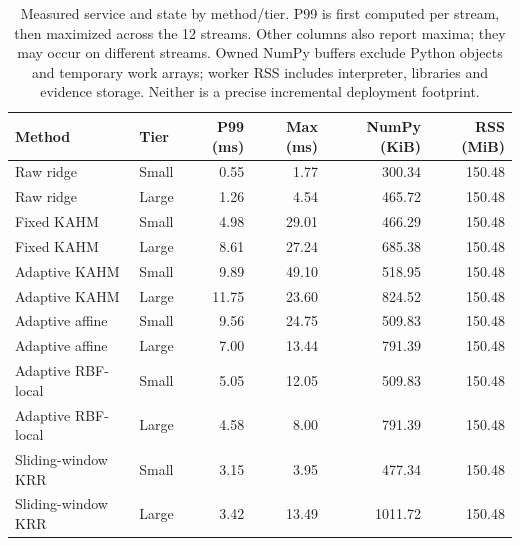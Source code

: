 \begin{table}[!htbp]
\centering\small\setlength{\tabcolsep}{5pt}
\caption{Measured service and state by method/tier. P99 is first computed per stream, then maximized across the 12 streams. Other columns also report maxima; they may occur on different streams. Owned NumPy buffers exclude Python objects and temporary work arrays; worker RSS includes interpreter, libraries and evidence storage. Neither is a precise incremental deployment footprint.}
\label{tab:adaptive-development-resources}
\begin{tabular}{@{}llrrrr@{}}
\toprule
Method & Tier & P99 (ms) & Max (ms) & NumPy (KiB) & RSS (MiB) \\
\midrule
Raw ridge & Small & 0.55 & 1.77 & 300.34 & 150.48 \\
Raw ridge & Large & 1.26 & 4.54 & 465.72 & 150.48 \\
Fixed KAHM & Small & 4.98 & 29.01 & 466.29 & 150.48 \\
Fixed KAHM & Large & 8.61 & 27.24 & 685.38 & 150.48 \\
Adaptive KAHM & Small & 9.89 & 49.10 & 518.95 & 150.48 \\
Adaptive KAHM & Large & 11.75 & 23.60 & 824.52 & 150.48 \\
Adaptive affine & Small & 9.56 & 24.75 & 509.83 & 150.48 \\
Adaptive affine & Large & 7.00 & 13.44 & 791.39 & 150.48 \\
Adaptive RBF-local & Small & 5.05 & 12.05 & 509.83 & 150.48 \\
Adaptive RBF-local & Large & 4.58 & 8.00 & 791.39 & 150.48 \\
Sliding-window KRR & Small & 3.15 & 3.95 & 477.34 & 150.48 \\
Sliding-window KRR & Large & 3.42 & 13.49 & 1011.72 & 150.48 \\
\bottomrule
\end{tabular}
\end{table}

